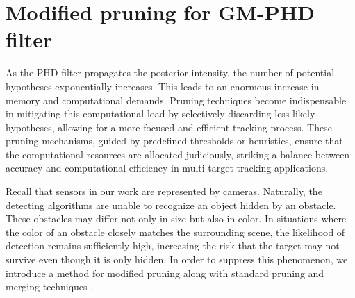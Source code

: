 \section{Modified pruning for GM-PHD filter}
As the PHD filter propagates the posterior intensity, the number of potential hypotheses exponentially increases.
This leads to an enormous increase in memory and computational demands. Pruning techniques become indispensable in
mitigating this computational load by selectively discarding less likely hypotheses, allowing for a more focused and
efficient tracking process. These pruning mechanisms, guided by predefined thresholds or heuristics, ensure that the
computational resources are allocated judiciously, striking a balance between accuracy and computational efficiency in multi-target tracking applications.

Recall that sensors in our work are represented by cameras. Naturally, the detecting algorithms are unable to
recognize an object hidden by an obstacle. These obstacles may differ not only in size but also in color. In
situations where the color of an obstacle closely matches the surrounding scene, the likelihood of detection remains
sufficiently high, increasing the risk that the target may not survive even though it is only hidden. In order to suppress this phenomenon, we introduce a method for modified pruning along with standard pruning and merging techniques \cite{VoMaPHD2006}.

